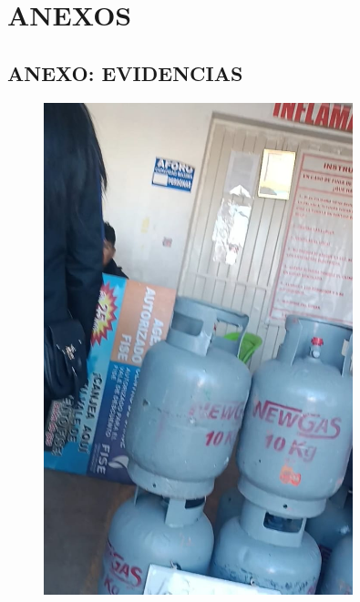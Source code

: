 \documentclass[11pt, a4paper]{article}
\begin{document}
\section{ANEXOS}
\subsection{ANEXO: EVIDENCIAS}
\begin{figure}[H]
\centering
\includegraphics[width=0.8\textwidth]{evidencia.png}
\end{figure}
\end{document}
